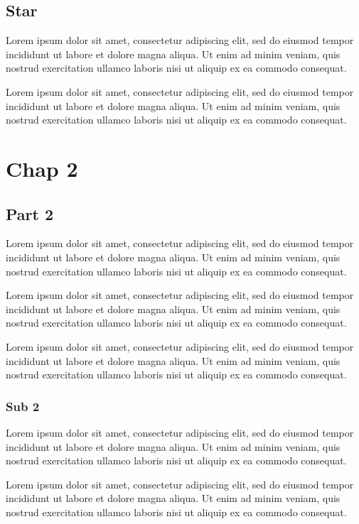 \documentclass{report}
\begin{document}
\section*{Star}
Lorem ipsum dolor sit amet, consectetur adipiscing elit, sed do eiusmod tempor incididunt ut labore et dolore magna aliqua. Ut enim ad minim veniam, quis nostrud exercitation ullamco laboris nisi ut aliquip ex ea commodo consequat.

Lorem ipsum dolor sit amet, consectetur adipiscing elit, sed do eiusmod tempor incididunt ut labore et dolore magna aliqua. Ut enim ad minim veniam, quis nostrud exercitation ullamco laboris nisi ut aliquip ex ea commodo consequat.

\chapter{Chap 2}
\section{Part 2}
Lorem ipsum dolor sit amet, consectetur adipiscing elit, sed do eiusmod tempor incididunt ut labore et dolore magna aliqua. Ut enim ad minim veniam, quis nostrud exercitation ullamco laboris nisi ut aliquip ex ea commodo consequat.

Lorem ipsum dolor sit amet, consectetur adipiscing elit, sed do eiusmod tempor incididunt ut labore et dolore magna aliqua. Ut enim ad minim veniam, quis nostrud exercitation ullamco laboris nisi ut aliquip ex ea commodo consequat.

Lorem ipsum dolor sit amet, consectetur adipiscing elit, sed do eiusmod tempor incididunt ut labore et dolore magna aliqua. Ut enim ad minim veniam, quis nostrud exercitation ullamco laboris nisi ut aliquip ex ea commodo consequat.

\subsection{Sub 2}
Lorem ipsum dolor sit amet, consectetur adipiscing elit, sed do eiusmod tempor incididunt ut labore et dolore magna aliqua. Ut enim ad minim veniam, quis nostrud exercitation ullamco laboris nisi ut aliquip ex ea commodo consequat.

Lorem ipsum dolor sit amet, consectetur adipiscing elit, sed do eiusmod tempor incididunt ut labore et dolore magna aliqua. Ut enim ad minim veniam, quis nostrud exercitation ullamco laboris nisi ut aliquip ex ea commodo consequat.
\end{document}
